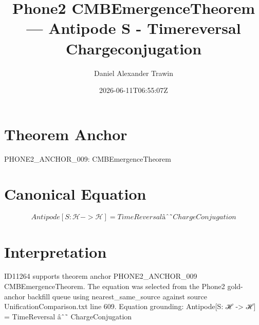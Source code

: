 \documentclass[11pt]{article}
\title{Phone2 CMBEmergenceTheorem — Antipode S - Timereversal Chargeconjugation}
\author{Daniel Alexander Trawin}
\date{2026-06-11T06:55:07Z}
\begin{document}
\maketitle
\section*{Theorem Anchor}
PHONE2_ANCHOR_009: CMBEmergenceTheorem
\section*{Canonical Equation}
\[
Antipode[S: ℋ -> ℋ] = TimeReversal âˆ˜ ChargeConjugation
\]
\section*{Interpretation}
ID11264 supports theorem anchor PHONE2_ANCHOR_009 CMBEmergenceTheorem. The equation was selected from the Phone2 gold-anchor backfill queue using nearest_same_source against source UnificationComparison.txt line 609. Equation grounding: Antipode[S: ℋ -> ℋ] = TimeReversal âˆ˜ ChargeConjugation
\end{document}
